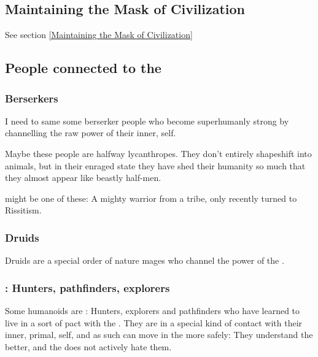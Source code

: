 \subsection{Maintaining the Mask of Civilization}
See section \ref{Maintaining the Mask of Civilization}









\subsection{People connected to the \wylde}





\subsubsection{Berserkers}
I need to same some berserker people who become superhumanly strong by channelling the raw power of their inner, \chaotic{} self. 

Maybe these people are halfway lycanthropes. They don't entirely shapeshift into animals, but in their enraged state they have shed their humanity so much that they almost appear like beastly half-men. 

\KarsaOrlong{} might be one of these: A mighty warrior from a \cregorr{} tribe, only recently turned to Rissitism. 





\subsubsection{Druids}
Druids are a special order of nature mages who channel the power of the \Wylde{}. 





\subsubsection{\Rangers: Hunters, pathfinders, explorers}
Some humanoids are \rangers: Hunters, explorers and pathfinders who have learned to live in a sort of pact with the \Wylde{}. They are in a special kind of contact with their inner, primal, \chaotic{} self, and as such can move in the \Wylde{} more safely: They understand the \Wylde{} better, and the \Wylde{} does not actively hate them. 

